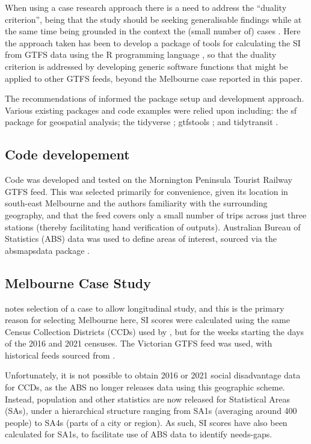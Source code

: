 \documentclass[preprint, 3p,
authoryear]{elsarticle} %
\begin{document}
When using a case research approach there is a need to address the
``duality criterion'', being that the study should be seeking
generalisable findings while at the same time being grounded in the
context the (small number of) cases
\citep{Denscombe2007aa, Ketokivi2014aa}. Here the approach taken has
been to develop a package of tools for calculating the SI from GTFS data
using the R programming language \citep{R-base}, so that the duality
criterion is addressed by developing generic software functions that
might be applied to other GTFS feeds, beyond the Melbourne case reported
in this paper.

The recommendations of \citet{wickham2023r} informed the package setup
and development approach. Various existing packages and code examples
were relied upon including: the sf package \citep{R-sf} for geospatial
analysis; the tidyverse \citep{tidyverse2019}; gtfstools
\citep{R-gtfstools}; and tidytransit \citep{R-tidytransit}.

\subsection{Code developement}\label{code-developement}

Code was developed and tested on the Mornington Peninsula Tourist
Railway GTFS feed. This was selected primarily for convenience, given
its location in south-east Melbourne and the authors familiarity with
the surrounding geography, and that the feed covers only a small number
of trips across just three stations (thereby facilitating hand
verification of outputs). Australian Bureau of Statistics (ABS) data was
used to define areas of interest, sourced via the absmapsdata package
\citep{R-absmapsdata}.

\subsection{Melbourne Case Study}\label{melbourne-case-study}

\citet{Yin2009aa} notes selection of a case to allow longitudinal study,
and this is the primary reason for selecting Melbourne here, SI scores
were calculated using the same Census Collection Districts (CCDs) used
by \citet{currie2010identifying}, but for the weeks starting the days of
the 2016 and 2021 censuses. The Victorian GTFS feed was used, with
historical feeds sourced from \citet{transitfeeds_victoria:2023aa}.

Unfortunately, it is not possible to obtain 2016 or 2021 social
disadvantage data for CCDs, as the ABS no longer releases data using
this geographic scheme. Instead, population and other statistics are now
released for Statistical Areas (SAs), under a hierarchical structure
ranging from SA1s (averaging around 400 people) to SA4s (parts of a city
or region)\citep{ABSmaps}. As such, SI scores have also been calculated
for SA1s, to facilitate use of ABS data to identify needs-gaps.
\end{document}
